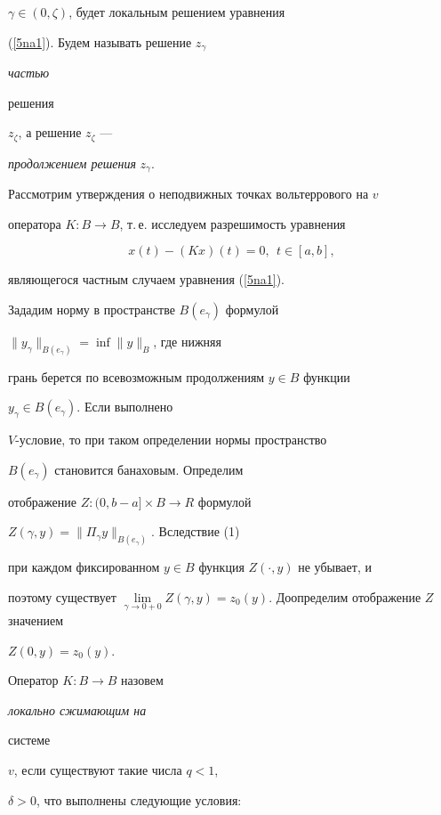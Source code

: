 $\gamma\in(0, \zeta)$, будет локальным решением уравнения


(\ref{5na1}). Будем называть решение $z_\gamma$ {\it частью


решения} $z_\zeta$, а решение $z_\zeta$ ---


{\it продолжением решения} $z_\gamma$.





Рассмотрим утверждения о неподвижных точках вольтеррового на $v$


оператора $K:B \to B$, т.\,е. исследуем разрешимость уравнения


\begin{equation} \label{5na2}


x(t)-(K x)(t)=0, \ \ t\in [a, b],


\end{equation}


являющегося частным случаем уравнения (\ref{5na1}).





Зададим норму в пространстве $B (e_{\gamma})$ формулой


$\| y_{\gamma} \|_{B (e_{\gamma})}


=\inf \| y \|_{B}$, где нижняя


грань берется по всевозможным продолжениям $y \in B$ функции


$y_{\gamma} \in B (e_{\gamma})$. Если выполнено


$V$-условие, то при таком определении нормы пространство


$B (e_{\gamma})$ становится банаховым. Определим


отображение $Z:(0, b-a] \times B \to R$ формулой


$Z(\gamma,y)= \| \Pi_{\gamma} y \|_{B (e_{\gamma})}$. Вследствие (1)


при каждом фиксированном $y\in B$ функция $Z(\cdot,y)$ не убывает, и


поэтому существует $\lim \limits_{\gamma\to


0+0}Z(\gamma,y)=z_0(y)$. Доопределим отображение $Z$ значением


$Z(0,y)=z_0(y)$.





Оператор $K:B \to B$ назовем {\it локально сжимающим на


системе} $v$, если существуют такие числа $q<1$,


$\delta>0$, что выполнены следующие условия:


